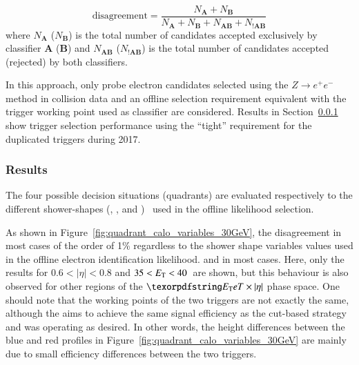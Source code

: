 \begin{equation}
    \text{disagreement} = \frac{N_{\textbf{A}}+N_{\textbf{B}}}{N_{\textbf{A}}+N_{\textbf{B}}+N_{\textbf{AB}}+N_{!\textbf{AB}}}
    \label{eq:disagreement}
\end{equation}
where $N_{\textbf{A}}$ ($N_{\textbf{B}}$) is the total number of candidates accepted exclusively by classifier $\textbf{A}$ ($\textbf{B}$) and $N_{\textbf{AB}}$ ($N_{\textbf{!AB}}$) is the total number of candidates accepted (rejected) by both classifiers.

In this approach, only probe electron candidates selected using the $Z\rightarrow e^+e^-$ \tnp method in collision data and an offline selection requirement equivalent with the trigger working point used as classifier are considered. Results in Section~\ref{top:quadrant_results} show
trigger selection performance using the \enquote{tight} requirement for the duplicated triggers during 2017.

\subsubsection{Results}\label{top:quadrant_results}


The four possible decision situations (quadrants) are evaluated respectively to the different shower-shapes (\reta{}, \rphi{}, \eratio{} and \rhad{})~\cite{TRIG-2018-05} used in the offline likelihood selection.

As shown in Figure~\ref{fig:quadrant_calo_variables_30GeV}, the disagreement in most cases of the order of 1\% regardless to the shower shape variables values used in the offline electron identification likelihood.
and in most cases. Here, only the results for $0.6<|\eta|<0.8$ and $35<E_{\text{T}}<40$~\GeV are shown, but this behaviour is also observed for other regions of the $\eteta$ phase space. 
One should note that the working points of the two triggers are not exactly the same, although the \rnn{} aims to achieve the same signal efficiency as the cut-based strategy and was operating as desired.  In other words, the height differences between the blue and red profiles in Figure~\ref{fig:quadrant_calo_variables_30GeV} are mainly due to small efficiency differences between the two triggers.




